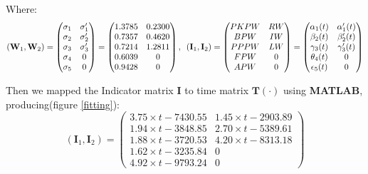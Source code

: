 \documentclass[12pt]{article}
\begin{document}
\hspace{2em}Where:
\begin{equation}
		(\textbf{W}_1,\textbf{W}_2)=
		\begin{pmatrix}
			\sigma_1 & \sigma_1' \\
			\sigma_2 & \sigma_2' \\
			\sigma_3 & \sigma_3' \\
			\sigma_4 & 0 \\
			\sigma_5 & 0
		\end{pmatrix}=\begin{pmatrix}
		1.3785 & 0.2300\\ 0.7357 & 0.4620\\ 0.7214 & 1.2811 \\ 0.6039 & 0\\ 0.9428 & 0
		
		\end{pmatrix},\hspace{0.5em}
			(\textbf{I}_1,\textbf{I}_2) = 
		\begin{pmatrix}
				PKPW & RW \\
				BPW & IW \\
				PPPW & LW \\
				FPW & 0 \\
				APW & 0 
		\end{pmatrix}=\begin{pmatrix}
		\alpha_1(t) & \alpha_1'(t) \\
		\beta_2(t) & \beta_2'(t) \\
		\gamma_3(t) & \gamma_3'(t) \\
		\theta_4(t) & 0 \\
		\epsilon_5(t) & 0
		\end{pmatrix}
		\label{weights}
\end{equation}

Then we mapped the Indicator matrix $\textbf{I}$ to time matrix $\textbf{T}(\cdot)$ using \textbf{MATLAB}, producing(figure \ref{fitting}):
\begin{equation}
	(\textbf{I}_1,\textbf{I}_2) = \begin{pmatrix}
		3.75\times t -7430.55 & 1.45\times t-2903.89 \\
		1.94\times t-3848.85 & 2.70\times t-5389.61 \\
		1.88\times t-3720.53 & 4.20\times t-8313.18 \\
		1.62\times t-3235.84 & 0 \\
		4.92\times t-9793.24 & 0 
	\end{pmatrix}
\end{equation}
\end{document}
